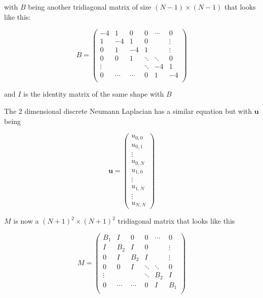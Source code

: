 with $B$ being another tridiagonal matrix of size $(N-1) \times (N-1)$ that looks like this:

\begin{equation}
B =
\begin{pmatrix}
    -4    &     1&     0&     0&\cdots&      0\\
    1     &    -4&     1&     0&      & \vdots\\
    0     &     1&    -4&     1&      & \vdots\\
    0     &     0&     1&\ddots&\ddots&      0\\
    \vdots&      &      &\ddots&    -4&      1\\
    0     &\cdots&\cdots&     0&     1&     -4\\
\end{pmatrix}
\end{equation}

and $I$ is the identity matrix of the same shape with $B$

The 2 dimensional discrete Neumann Laplacian has a similar equation but with $\mathbf{u}$ being 

\begin{equation}
    \mathbf{u} = 
\begin{pmatrix}
    u_{0,0}\\
    u_{0,1}\\
    \vdots\\
    u_{0,N}\\
    u_{1,0}\\
    \vdots\\
    u_{1,N}\\
    \vdots\\
    u_{N,N}
\end{pmatrix}
\end{equation}

$M$ is now a $(N+1)^2 \times (N+1)^2$ tridiagonal matrix that looks like this

\begin{equation}
    M =
\begin{pmatrix}
    B_1   &     I&     0&     0&\cdots&      0\\
    I     &   B_2&     I&     0&      & \vdots\\
    0     &     I&   B_2&     I&      & \vdots\\
    0     &     0&     I&\ddots&\ddots&      0\\
    \vdots&      &      &\ddots&   B_2&      I\\
    0     &\cdots&\cdots&     0&     I&    B_1\\
\end{pmatrix}
\end{equation}


